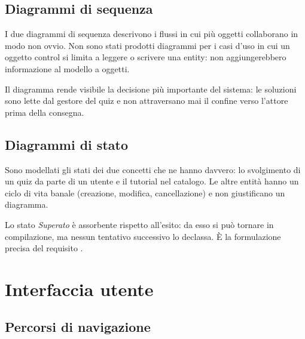 \subsection{Diagrammi di sequenza}

I due diagrammi di sequenza descrivono i flussi in cui più oggetti
collaborano in modo non ovvio. Non sono stati prodotti diagrammi per i casi
d'uso in cui un oggetto control si limita a leggere o scrivere una entity:
non aggiungerebbero informazione al modello a oggetti.


Il diagramma rende visibile la decisione più importante del sistema: le
soluzioni sono lette dal gestore del quiz e non attraversano mai il confine
verso l'attore prima della consegna.


\subsection{Diagrammi di stato}

Sono modellati gli stati dei due concetti che ne hanno davvero: lo
svolgimento di un quiz da parte di un utente e il tutorial nel catalogo. Le
altre entità hanno un ciclo di vita banale (creazione, modifica,
cancellazione) e non giustificano un diagramma.


Lo stato \emph{Superato} è assorbente rispetto all'esito: da esso si può
tornare in compilazione, ma nessun tentativo successivo lo declassa. È la
formulazione precisa del requisito .


\section{Interfaccia utente}
\label{sec:rad-ui}

\subsection{Percorsi di navigazione}

